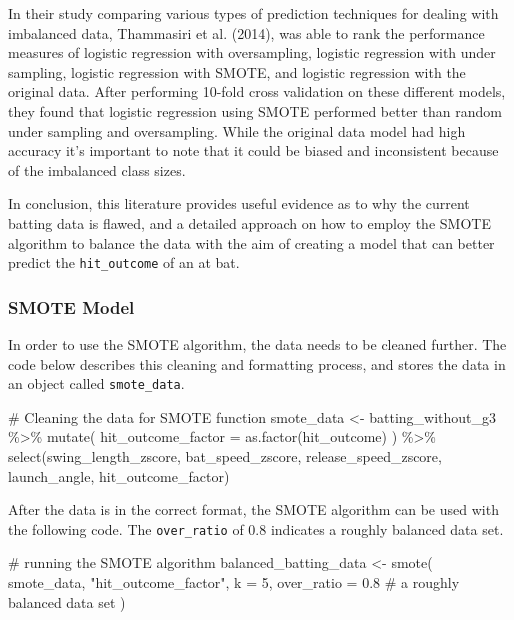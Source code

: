 \documentclass[
  letterpaper,
  DIV=11,
  numbers=noendperiod]{scrartcl}
\newenvironment{Shaded}{\begin{snugshade}}{\end{snugshade}}
\newcommand{\AttributeTok}[1]{\textcolor[rgb]{0.40,0.45,0.13}{#1}}
\newcommand{\CommentTok}[1]{\textcolor[rgb]{0.37,0.37,0.37}{#1}}
\newcommand{\DecValTok}[1]{\textcolor[rgb]{0.68,0.00,0.00}{#1}}
\newcommand{\FloatTok}[1]{\textcolor[rgb]{0.68,0.00,0.00}{#1}}
\newcommand{\FunctionTok}[1]{\textcolor[rgb]{0.28,0.35,0.67}{#1}}
\newcommand{\NormalTok}[1]{\textcolor[rgb]{0.00,0.23,0.31}{#1}}
\newcommand{\OtherTok}[1]{\textcolor[rgb]{0.00,0.23,0.31}{#1}}
\newcommand{\SpecialCharTok}[1]{\textcolor[rgb]{0.37,0.37,0.37}{#1}}
\newcommand{\StringTok}[1]{\textcolor[rgb]{0.13,0.47,0.30}{#1}}
\begin{document}
In their study comparing various types of prediction techniques for
dealing with imbalanced data, Thammasiri et al. (2014), was able to rank
the performance measures of logistic regression with oversampling,
logistic regression with under sampling, logistic regression with SMOTE,
and logistic regression with the original data. After performing 10-fold
cross validation on these different models, they found that logistic
regression using SMOTE performed better than random under sampling and
oversampling. While the original data model had high accuracy it's
important to note that it could be biased and inconsistent because of
the imbalanced class sizes.

In conclusion, this literature provides useful evidence as to why the
current batting data is flawed, and a detailed approach on how to employ
the SMOTE algorithm to balance the data with the aim of creating a model
that can better predict the \texttt{hit\_outcome} of an at bat.

\subsubsection{SMOTE Model}\label{smote-model}

In order to use the SMOTE algorithm, the data needs to be cleaned
further. The code below describes this cleaning and formatting process,
and stores the data in an object called \texttt{smote\_data}.

\begin{Shaded}
\begin{Highlighting}[]
\CommentTok{\# Cleaning the data for SMOTE function }
\NormalTok{smote\_data }\OtherTok{\textless{}{-}}\NormalTok{ batting\_without\_g3 }\SpecialCharTok{\%\textgreater{}\%}
  \FunctionTok{mutate}\NormalTok{(}
    \AttributeTok{hit\_outcome\_factor =} \FunctionTok{as.factor}\NormalTok{(hit\_outcome)}
\NormalTok{  ) }\SpecialCharTok{\%\textgreater{}\%}
  \FunctionTok{select}\NormalTok{(swing\_length\_zscore,}
\NormalTok{         bat\_speed\_zscore,}
\NormalTok{         release\_speed\_zscore,}
\NormalTok{         launch\_angle,}
\NormalTok{         hit\_outcome\_factor)}
\end{Highlighting}
\end{Shaded}

After the data is in the correct format, the SMOTE algorithm can be used
with the following code. The \texttt{over\_ratio} of 0.8 indicates a
roughly balanced data set.

\begin{Shaded}
\begin{Highlighting}[]
\CommentTok{\# running the SMOTE algorithm }
\NormalTok{balanced\_batting\_data }\OtherTok{\textless{}{-}}
  \FunctionTok{smote}\NormalTok{(}
\NormalTok{    smote\_data,}
    \StringTok{"hit\_outcome\_factor"}\NormalTok{,}
    \AttributeTok{k =} \DecValTok{5}\NormalTok{,}
    \AttributeTok{over\_ratio =} \FloatTok{0.8} \CommentTok{\# a roughly balanced data set }
\NormalTok{  )}
\end{Highlighting}
\end{Shaded}
\end{document}

